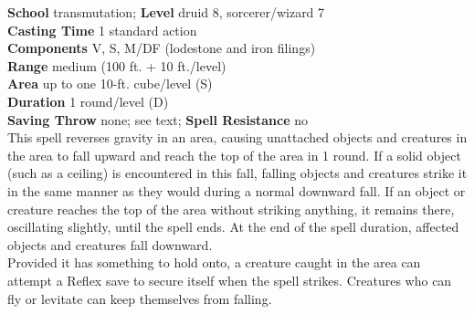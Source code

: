 \textbf{School} transmutation; \textbf{Level} druid 8, sorcerer/wizard 7\\
\textbf{Casting Time} 1 standard action\\
\textbf{Components} V, S, M/DF (lodestone and iron filings)\\
\textbf{Range }medium (100 ft. + 10 ft./level)\\
\textbf{Area} up to one 10-ft. cube/level (S)\\
\textbf{Duration} 1 round/level (D)\\
\textbf{Saving Throw} none; see text; \textbf{Spell Resistance} no\\
This spell reverses gravity in an area, causing unattached objects and creatures in the area to fall upward and reach the top of the area in 1 round. If a solid object (such as a ceiling) is encountered in this fall, falling objects and creatures strike it in the same manner as they would during a normal downward fall. If an object or creature reaches the top of the area without striking anything, it remains there, oscillating slightly, until the spell ends. At the end of the spell duration, affected objects and creatures fall downward.\\
Provided it has something to hold onto, a creature caught in the area can attempt a Reflex save to secure itself when the spell strikes. Creatures who can fly or levitate can keep themselves from falling.\\
